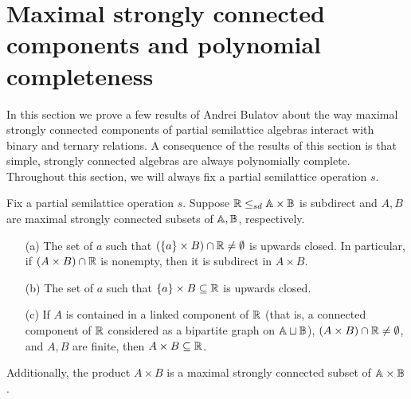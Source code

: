 \documentclass[letterpaper,11pt]{article}
\begin{document}
\section{Maximal strongly connected components and polynomial completeness}

In this section we prove a few results of Andrei Bulatov \cite{bulatov-bounded} about the way maximal strongly connected components of partial semilattice algebras interact with binary and ternary relations. A consequence of the results of this section is that simple, strongly connected algebras are always polynomially complete. Throughout this section, we will always fix a partial semilattice operation $s$.

\begin{thm}\label{strong-binary} Fix a partial semilattice operation $s$. Suppose $\mathbb{R} \le_{sd} \mathbb{A} \times \mathbb{B}$ is subdirect and $A,B$ are maximal strongly connected subsets of $\mathbb{A}, \mathbb{B}$, respectively.
\begin{itemize}
\item[(a)] The set of $a$ such that $(\{a\} \times B) \cap \mathbb{R} \ne \emptyset$ is upwards closed. In particular, if $(A\times B)\cap \mathbb{R}$ is nonempty, then it is subdirect in $A\times B$.

\item[(b)] The set of $a$ such that $\{a\} \times B \subseteq \mathbb{R}$ is upwards closed.

\item[(c)] If $A$ is contained in a linked component of $\mathbb{R}$ (that is, a connected component of $\mathbb{R}$ considered as a bipartite graph on $\mathbb{A} \sqcup \mathbb{B}$), $(A\times B) \cap \mathbb{R} \ne \emptyset$, and $A,B$ are finite, then $A \times B \subseteq \mathbb{R}$.
\end{itemize}
Additionally, the product $A\times B$ is a maximal strongly connected subset of $\mathbb{A} \times \mathbb{B}$.
\end{thm}
\end{document}
